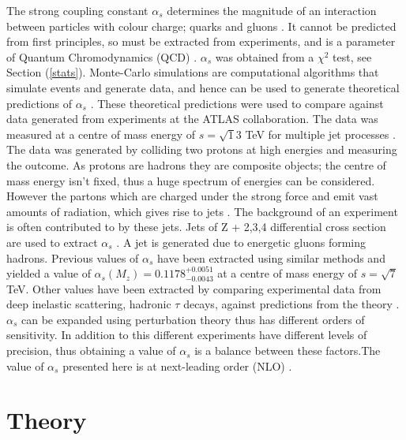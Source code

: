 \documentclass[12pt, onecolumn]{revtex4}    %
\begin{document}
The strong coupling constant ${\alpha _s}$ determines the magnitude of an interaction between particles with colour charge; quarks and gluons \cite{PPB}. It cannot be predicted from first principles, so must be extracted from experiments, and is a parameter of Quantum Chromodynamics (QCD) \cite{DMP}.  ${\alpha _s}$ was obtained from a ${\chi^2}$ test, see Section (\ref{stats}). 
Monte-Carlo simulations are computational algorithms that simulate events and generate data, and hence can be used to generate theoretical predictions of ${\alpha _s}$ \cite{MONTE}. These theoretical predictions were used to compare against data generated from experiments at the ATLAS collaboration. The data was measured at a centre of mass  energy of ${s = \sqrt13}$ TeV for multiple jet processes \cite{HEPP}. The data was generated by colliding two protons at high energies and measuring the outcome. As protons are hadrons they are composite objects; the centre of mass energy isn't fixed, thus a huge spectrum of energies can be considered. However the partons which are charged under the strong force and emit vast amounts of radiation, which gives rise to jets \cite{PHD}. The background of an experiment is often contributed to by these jets. Jets of Z + 2,3,4 differential cross section are used to extract ${\alpha _s}$ \cite{HEPP}. A jet is generated due to energetic gluons forming hadrons. Previous values of ${\alpha _s}$ have been extracted using similar methods and yielded a value of ${\alpha _s(M_z) = 0.1178^{+0.0051}_{-0.0043}}$ at a centre of mass energy of ${s=\sqrt7}$  TeV. Other values have been extracted by comparing experimental data from deep inelastic scattering,  hadronic ${\tau}$ decays, against predictions from the theory \cite{DMP}. ${\alpha _s}$ can be expanded using perturbation theory thus has different orders of sensitivity. In addition to this different experiments have different levels of precision, thus obtaining a value of ${\alpha_s}$ is a balance between these factors.The value of ${\alpha _s}$ presented here is at next-leading order (NLO) \cite{DMP}. 



\section{Theory} 
\end{document}
